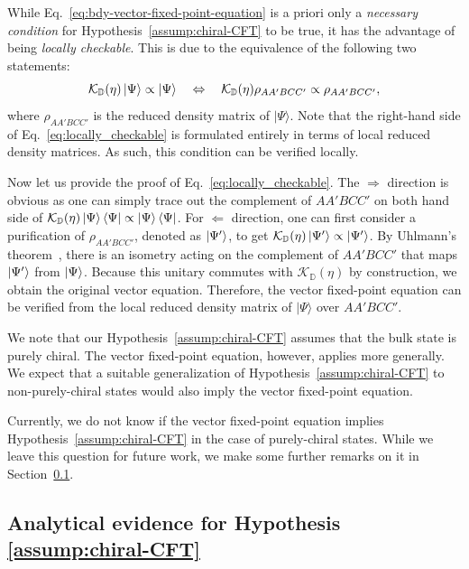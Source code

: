 \documentclass[12pt, nofootinbib]{article}
\theoremstyle{plain}
\theoremstyle{assumption}
\theoremstyle{definition}
\theoremstyle{plain}
\theoremstyle{plain}
\theoremstyle{plain}
\theoremstyle{plain}
\theoremstyle{plain}
\newcommand{\calK}{{\mathcal K}}
\def\KD{\calK_{\mathbb{D}}}
\begin{document}
While Eq.~\eqref{eq:bdy-vector-fixed-point-equation} is a priori only a \emph{necessary condition} for Hypothesis~\ref{assump:chiral-CFT} to be true, it has the advantage of being \emph{locally checkable}. This is due to the equivalence of the following two statements:
\begin{equation}
\label{eq:locally_checkable}
    \KD(\eta)\ket{\Psi} \propto \ket{\Psi}  \quad \Leftrightarrow \quad \KD(\eta) \rho_{AA'BCC'} \propto \rho_{AA'BCC'},
\end{equation}
where $\rho_{AA'BCC'}$ is the reduced density matrix of $|\Psi\rangle$. Note that the right-hand side of Eq.~\eqref{eq:locally_checkable} is formulated entirely in terms of local reduced density matrices. As such, this condition can be verified locally. 

Now let us provide the proof of Eq.~\eqref{eq:locally_checkable}. The $\Rightarrow$ direction is obvious as one can simply trace out the complement of $AA'BCC'$ on both hand side of $\KD(\eta)\ket{\Psi}\bra{\Psi} \propto \ket{\Psi}\bra{\Psi}$. For $\Leftarrow$ direction, one can first consider a purification of $\rho_{AA'BCC'}$, denoted as  $\left|\Psi'\right\rangle$, to get $\KD(\eta)\ket{\Psi'}\propto \ket{\Psi'}$. 
By Uhlmann's theorem~\cite{Uhlmann1976}, there is an isometry acting on the complement of $AA'BCC'$ that maps $\left|\Psi'\right\rangle$ from $\left|\Psi\right\rangle$. Because this unitary commutes with $\KD(\eta)$ by construction, we obtain the original vector equation. Therefore, the vector fixed-point equation can be verified from the local reduced density matrix of $|\Psi\rangle$ over $AA'BCC'$.

We note that our Hypothesis~\ref{assump:chiral-CFT} assumes that the bulk state is purely chiral.  The vector fixed-point equation, however, applies more generally.  We expect that a suitable generalization of Hypothesis~\ref{assump:chiral-CFT} to non-purely-chiral states would also imply the vector fixed-point equation.

Currently, we do not know if the vector fixed-point equation implies Hypothesis~\ref{assump:chiral-CFT} in the case of purely-chiral states. While we leave this question for future work, we make some further remarks on it in Section~\ref{subsec:cylinder-argument}.

\subsection{Analytical evidence for Hypothesis \ref{assump:chiral-CFT}}
\label{subsec:cylinder-argument}
\end{document}
